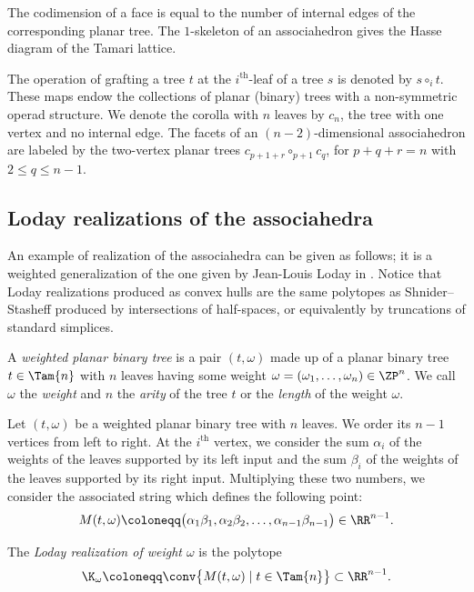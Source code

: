 The codimension of a face is equal to the number of internal edges of the corresponding planar tree.
The $1$-skeleton of an associahedron gives the Hasse diagram of the Tamari lattice.

The operation of grafting a tree $t$ at the $i^\text{th}$-leaf of a tree $s$ is denoted by $s\circ_i t$.
These maps endow the collections of planar (binary) trees with a non-symmetric operad structure.
We denote the corolla with $n$ leaves by $c_n$, \ie the tree with one vertex and no internal edge. The facets of an $(n-2)$-dimensional associahedron are labeled by
the two-vertex planar trees $c_{p+1+r} \circ_{p+1} c_q$, for $p+q+r=n$ with $2\leq q\leq n-1$.

\subsection{Loday realizations of the associahedra}

An example of realization of the associahedra can be given as follows; it is a weighted generalization of the one given by Jean-Louis Loday in \cite{Loday04a}. Notice that Loday realizations produced as convex hulls are the same polytopes as Shnider--Stasheff \cite{StasheffShnider97} produced by intersections of half-spaces, or equivalently by truncations of standard simplices.

\begin{definition}
A \emph{weighted planar binary tree} is a pair $(t, \omega)$ made up of a planar binary tree $t\in \Tam{n}$ with $n$ leaves having some weight $\omega= (\omega_1, \ldots, \omega_n) \in \ZP^n$. We call
$\omega$ the \emph{weight} and
$n$ the \emph{arity} of the tree $t$ or the \emph{length} of the weight $\omega$.
\end{definition}

Let $(t, \omega)$ be a weighted planar binary tree with $n$ leaves. We order its $n-1$ vertices from left to right. At the $i^\text{th}$ vertex, we consider the sum $\alpha_i$ of the weights of the leaves supported by its left input and
the sum $\beta_i$ of the weights of the leaves supported by its right input.
Multiplying these two numbers, we consider the associated string which defines the following point:\vspace*{-3pt}
\[M(t, \omega) \coloneqq \big(\alpha_1\beta_1, \alpha_2\beta_2, \ldots, \alpha_{n-1}\beta_{n-1}\big)\in \RR^{n-1}. \]

\begin{definition}
The \emph{Loday realization of weight $\omega$} is the polytope\vspace*{-3pt}
\[\K_\omega \coloneqq \conv \big\{M(t, \omega)\mid t\in \Tam{n} \big\}\subset \RR^{n-1}.\]
\end{definition}

